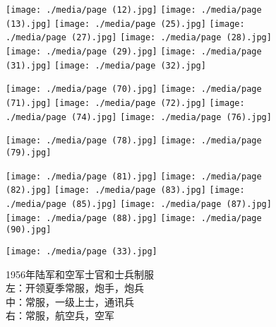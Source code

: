 \begin{figure}
    \texttt{[image: ./media/page (12).jpg]}
    \texttt{[image: ./media/page (13).jpg]}
    \texttt{[image: ./media/page (25).jpg]}
    \texttt{[image: ./media/page (27).jpg]}
    \texttt{[image: ./media/page (28).jpg]}
    \texttt{[image: ./media/page (29).jpg]}
    \texttt{[image: ./media/page (31).jpg]}
    \texttt{[image: ./media/page (32).jpg]}
    
    \texttt{[image: ./media/page (70).jpg]}
    \texttt{[image: ./media/page (71).jpg]}
    \texttt{[image: ./media/page (72).jpg]}
    \texttt{[image: ./media/page (74).jpg]}
    \texttt{[image: ./media/page (76).jpg]}

    \texttt{[image: ./media/page (78).jpg]}
    \texttt{[image: ./media/page (79).jpg]}

    \texttt{[image: ./media/page (81).jpg]}
    \texttt{[image: ./media/page (82).jpg]}
    \texttt{[image: ./media/page (83).jpg]}
    \texttt{[image: ./media/page (85).jpg]}
    \texttt{[image: ./media/page (87).jpg]}
    \texttt{[image: ./media/page (88).jpg]}
    \texttt{[image: ./media/page (90).jpg]}
    
\end{figure}

\begin{figure}
    \texttt{[image: ./media/page (33).jpg]}
    \caption{1956年陆军和空军士官和士兵制服\\左：开领夏季常服，炮手，炮兵\\中：常服，一级上士，通讯兵\\右：常服，航空兵，空军}
\end{figure}

